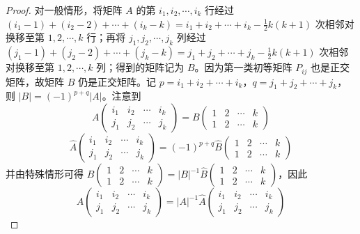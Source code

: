 \documentclass[../../main.tex]{subfiles}%
\begin{document}
\begin{proof}
对一般情形，将矩阵 \(A\) 的第 \(i_1,i_2,\cdots,i_k\) 行经过 \((i_1 - 1)+(i_2 - 2)+\cdots+(i_k - k)=i_1 + i_2 + \cdots + i_k - \frac{1}{2}k(k + 1)\) 次相邻对换移至第 \(1,2,\cdots,k\) 行；再将 \(j_1,j_2,\cdots,j_k\) 列经过 \((j_1 - 1)+(j_2 - 2)+\cdots+(j_k - k)=j_1 + j_2 + \cdots + j_k - \frac{1}{2}k(k + 1)\) 次相邻对换移至第 \(1,2,\cdots,k\) 列；得到的矩阵记为 \(B\)。因为第一类初等矩阵 \(P_{ij}\) 也是正交矩阵，故矩阵 \(B\) 仍是正交矩阵。记 \(p = i_1 + i_2 + \cdots + i_k\)，\(q = j_1 + j_2 + \cdots + j_k\)，则 \(\vert B\vert = (-1)^{p + q}\vert A\vert\)。注意到
\[A\begin{pmatrix}
i_1 & i_2 & \cdots & i_k \\
j_1 & j_2 & \cdots & j_k
\end{pmatrix} = B\begin{pmatrix}
1 & 2 & \cdots & k \\
1 & 2 & \cdots & k
\end{pmatrix}\]
\[\widehat{A}\begin{pmatrix}
i_1 & i_2 & \cdots & i_k \\
j_1 & j_2 & \cdots & j_k
\end{pmatrix} = (-1)^{p + q}\widehat{B}\begin{pmatrix}
1 & 2 & \cdots & k \\
1 & 2 & \cdots & k
\end{pmatrix}\]
并由特殊情形可得 \(B\begin{pmatrix}
1 & 2 & \cdots & k \\
1 & 2 & \cdots & k
\end{pmatrix} = \vert B\vert^{-1}\widehat{B}\begin{pmatrix}
1 & 2 & \cdots & k \\
1 & 2 & \cdots & k
\end{pmatrix}\)，因此
\[A\begin{pmatrix}
i_1 & i_2 & \cdots & i_k \\
j_1 & j_2 & \cdots & j_k
\end{pmatrix} = \vert A\vert^{-1}\widehat{A}\begin{pmatrix}
i_1 & i_2 & \cdots & i_k \\
j_1 & j_2 & \cdots & j_k
\end{pmatrix}\] 
\end{proof}
\end{document}

